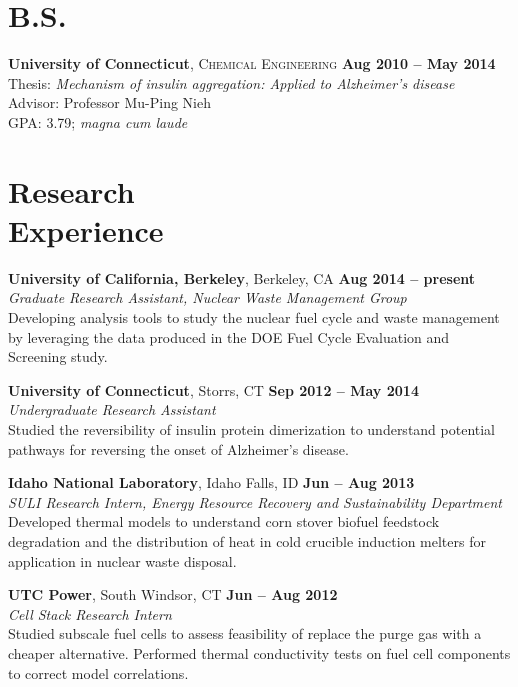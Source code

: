 \documentclass[margin,line]{resume}
\begin{document}
\begin{resume}
\section{\mysidestyle B.S.}
    \textbf{University of Connecticut}, 
    \textsc{Chemical Engineering} \hfill 
    \textbf{Aug 2010 -- May 2014} \vspace{1 mm} \\
    Thesis: \textsl{Mechanism of insulin aggregation: Applied to Alzheimer’s disease} \\
    Advisor: Professor Mu-Ping Nieh \\
    GPA: 3.79; \textsl{magna cum laude} \\


\section{\mysidestyle Research \\ Experience}

\textbf{University of California, Berkeley}, Berkeley, CA \hfill 
    \textbf{Aug 2014 -- present } \\
\textsl{Graduate Research Assistant, Nuclear Waste Management Group} \\
Developing analysis tools to study the nuclear fuel cycle and waste management by leveraging the data produced in the DOE Fuel Cycle Evaluation and Screening study.

\textbf{University of Connecticut}, Storrs, CT \hfill 
    \textbf{Sep 2012 -- May 2014} \\
\textsl{Undergraduate Research Assistant} \\
Studied the reversibility of insulin protein dimerization to understand potential pathways for reversing the onset of Alzheimer's disease.

\textbf{Idaho National Laboratory}, Idaho Falls, ID \hfill 
    \textbf{Jun -- Aug 2013} \\
\textsl{SULI Research Intern, Energy Resource Recovery and Sustainability Department} \\
Developed thermal models to understand corn stover biofuel feedstock degradation and the distribution of heat in cold crucible induction melters for application in nuclear waste disposal.

\textbf{UTC Power}, South Windsor, CT \hfill 
    \textbf{Jun -- Aug 2012} \\
\textsl{Cell Stack Research Intern} \\
Studied subscale fuel cells to assess feasibility of replace the purge gas with a cheaper alternative. Performed thermal conductivity tests on fuel cell components to correct model correlations.\\


\end{resume}
\end{document}

